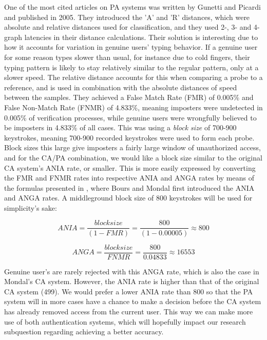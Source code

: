 \documentclass[informationsecurity]{gucmasterproject}
\begin{document}
One of the most cited articles on PA systems was written by Gunetti and Picardi \cite{gnp} and published in 2005.
They introduced the 'A' and 'R' distances, which were absolute and relative distances used for classification, and they used 2-, 3- and 4-graph latencies in their distance calculations.
Their solution is interesting due to how it accounts for variation in genuine users' typing behavior.
If a genuine user for some reason types slower than usual, for instance due to cold fingers, their typing pattern is likely to stay relatively similar to the regular pattern, only at a slower speed.
The relative distance accounts for this when comparing a probe to a reference, and is used in combination with the absolute distances of speed between the samples.
They achieved a False Match Rate (FMR) of 0.005\% and False Non-Match Rate (FNMR) of 4.833\%, meaning imposters were undetected in 0.005\% of verification processes, while genuine users were wrongfully believed to be imposters in 4.833\% of all cases. 
This was using a \textit{block size} of 700-900 keystrokes, meaning 700-900 recorded keystrokes were used to form each probe.
Block sizes this large give imposters a fairly large window of unauthorized access, and for the CA/PA combination, we would like a block size similar to the original CA system's ANIA rate, or smaller.
This is more easily expressed by converting the FMR and FNMR rates into respective ANIA and ANGA rates by means of the formulas presented in \cite{CA-performance}, where Bours and Mondal first introduced the ANIA and ANGA rates.
A middleground block size of 800 keystrokes will be used for simplicity's sake:

\begin{equation}
ANIA = \frac{block size}{(1-FMR)} = \frac{800}{(1-0.00005)} \approx 800
\end{equation}

\begin{equation}
ANGA = \frac{block size}{FNMR} = \frac{800}{0.04833} \approx 16553
\end{equation}

Genuine user's are rarely rejected with this ANGA rate, which is also the case in Mondal's \cite{mondal} CA system.
However, the ANIA rate is higher than that of the original CA system (499).
We would prefer a lower ANIA rate than 800 so that the PA system will in more cases have a chance to make a decision before the CA system has already removed access from the current user.
This way we can make more use of both authentication systems, which will hopefully impact our research subquestion regarding achieving a better accuracy.
\end{document}
